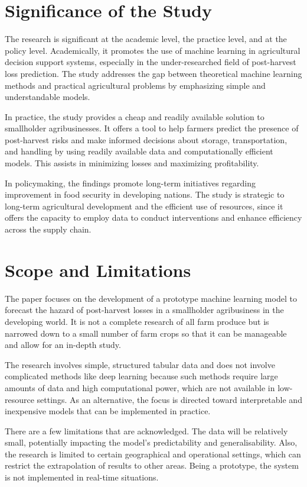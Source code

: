 \section{Significance of the Study}

The research is significant at the academic level, the practice level, and at the policy level.
Academically, it promotes the use of machine learning in agricultural decision support systems,
especially in the under-researched field of post-harvest loss prediction. The study addresses the
gap between theoretical machine learning methods and practical agricultural problems by
emphasizing simple and understandable models.

In practice, the study provides a cheap and readily available solution to smallholder
agribusinesses. It offers a tool to help farmers predict the presence of post-harvest risks and
make informed decisions about storage, transportation, and handling by using readily available
data and computationally efficient models. This assists in minimizing losses and maximizing
profitability.

In policymaking, the findings promote long-term initiatives regarding improvement in food security
in developing nations. The study is strategic to long-term agricultural development and the
efficient use of resources, since it offers the capacity to employ data to conduct interventions
and enhance efficiency across the supply chain.


\section{Scope and Limitations}

The paper focuses on the development of a prototype machine learning model to forecast the hazard
of post-harvest losses in a smallholder agribusiness in the developing world. It is not a complete
research of all farm produce but is narrowed down to a small number of farm crops so that it can
be manageable and allow for an in-depth study.

The research involves simple, structured tabular data and does not involve complicated methods
like deep learning because such methods require large amounts of data and high computational
power, which are not available in low-resource settings. As an alternative, the focus is directed
toward interpretable and inexpensive models that can be implemented in practice.

There are a few limitations that are acknowledged. The data will be relatively small, potentially
impacting the model's predictability and generalisability. Also, the research is limited to
certain geographical and operational settings, which can restrict the extrapolation of results to
other areas. Being a prototype, the system is not implemented in real-time situations.


